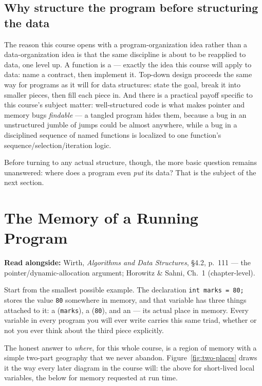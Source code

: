 \documentclass[11pt]{article}
\begin{document}
\subsection{Why structure the program before structuring the data}

The reason this course opens with a program-organization idea rather than a
data-organization idea is that the same discipline is about to be reapplied
to data, one level up. A function is a  --- exactly
the idea this course will apply to data: name a contract, then implement it.
Top-down design proceeds the same way for programs as it will for data
structures: state the goal, break it into smaller pieces, then fill each
piece in. And there is a practical payoff specific to this course's subject
matter: well-structured code is what makes pointer and memory bugs
\emph{findable} --- a tangled program hides them, because a bug in an
unstructured jumble of jumps could be almost anywhere, while a bug in a
disciplined sequence of named functions is localized to one function's
sequence/selection/iteration logic. 

Before turning to any actual structure, though, the more basic question
remains unanswered: where does a program even \emph{put} its data? That is
the subject of the next section.

\section{The Memory of a Running Program}
\label{sec:memory}

\textbf{Read alongside:} Wirth, \textit{Algorithms and Data Structures}, \S4.2, p.~111 --- the pointer/dynamic-allocation argument; Horowitz \& Sahni, Ch.~1 (chapter-level).

Start from the smallest possible example. The declaration \texttt{int marks
= 80;} stores the value \texttt{80} somewhere in memory, and that variable
has three things attached to it: a  (\texttt{marks}), a
 (\texttt{80}), and an  --- its actual place in
memory.  Every variable in every program you will ever write carries this same
triad, whether or not you ever think about the third piece explicitly.

The honest answer to \emph{where}, for this whole course, is a region of
memory with a simple two-part geography that we never abandon.
Figure~\ref{fig:two-places} draws it the way every later diagram in the
course will: the  above for short-lived local variables, the
 below for memory requested at run time.
\end{document}
